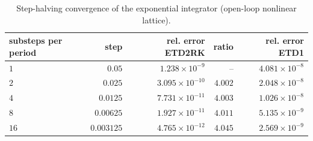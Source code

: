 \begin{table}[t]
\centering
\caption{Step-halving convergence of the exponential integrator (open-loop nonlinear lattice).}
\label{tab:exp8_convergence}
\footnotesize
\setlength{\tabcolsep}{4pt}
\begin{tabular}{lrrrr}
\toprule
substeps per period & step & rel. error ETD2RK & ratio & rel. error ETD1 \\
\midrule
$1$ & $0.05$ & $1.238\times10^{-9}$ & -- & $4.081\times10^{-8}$ \\
$2$ & $0.025$ & $3.095\times10^{-10}$ & $4.002$ & $2.048\times10^{-8}$ \\
$4$ & $0.0125$ & $7.731\times10^{-11}$ & $4.003$ & $1.026\times10^{-8}$ \\
$8$ & $0.00625$ & $1.927\times10^{-11}$ & $4.011$ & $5.135\times10^{-9}$ \\
$16$ & $0.003125$ & $4.765\times10^{-12}$ & $4.045$ & $2.569\times10^{-9}$ \\
\bottomrule
\end{tabular}
\end{table}
